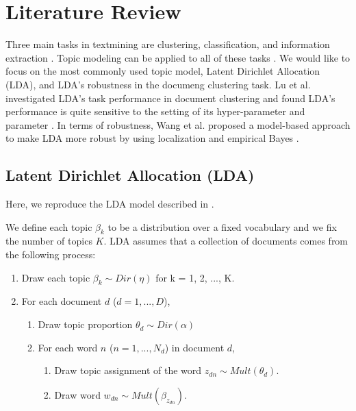\documentclass{article}
\begin{document}
\section{Literature Review}

Three main tasks in textmining are clustering, classification, and information extraction \cite{allahyari2017brief}. Topic modeling can be applied to all of these tasks \cite{lu2011investigating}. We would like to focus on the most commonly used topic model, Latent Dirichlet Allocation (LDA), and LDA's robustness in the documeng clustering task. Lu et al. investigated LDA's task performance in document clustering and found LDA's performance is quite sensitive to the setting of its hyper-parameter and parameter \cite{lu2011investigating}. In terms of robustness, Wang et al. proposed a model-based approach to make LDA more robust by using localization and empirical Bayes \cite{wang2018general}.




\subsection{Latent Dirichlet Allocation (LDA)}

Here, we reproduce the LDA model described in \cite{wang2018general}.

We define each topic $\beta_k$ to be a distribution over a fixed vocabulary and we fix the number of topics $K$. LDA assumes that a collection of documents comes from the following process:

\begin{enumerate}
  \item Draw each topic $\beta_k \sim Dir(\eta)$ for k = 1, 2, ..., K.
  \item For each document $d$ ($d = 1, ..., D$),
  \begin{enumerate}
    \item Draw topic proportion $\theta_d \sim Dir(\alpha)$
    \item For each word $n$ ($n = 1, ..., N_d$) in document $d$,
    \begin{enumerate}
      \item Draw topic assignment of the word $z_{dn} \sim Mult(\theta_d)$.
      \item Draw word $w_{dn} \sim Mult(\beta_{z_{dn}})$.
    \end{enumerate}
  \end{enumerate}
\end{enumerate}
\end{document}
